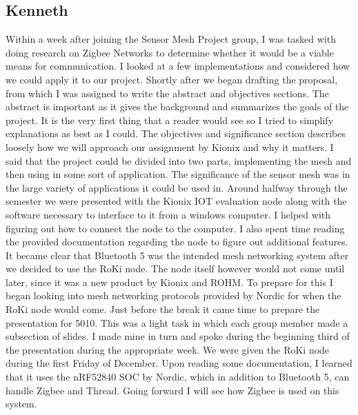 \documentclass[11pt, a4paper]{article}
\begin{document}
\subsection{Kenneth}

Within a week after joining the Sensor Mesh Project group, I was tasked with doing research on Zigbee Networks to determine whether it would be a viable means for communication.  I looked at a few implementations and considered how we could apply it to our project. Shortly after we began drafting the proposal, from which I was assigned to write the abstract and objectives sections. The abstract is important as it gives the background and summarizes the goals of the project. It is the very first thing that a reader would see so I tried to simplify explanations as best as I could. The objectives and significance section describes loosely how we will approach our assignment by Kionix and why it matters. I said that the project could be divided into two parts, implementing the mesh and then using in some sort of application. The significance of the sensor mesh was in the large variety of applications it could be used in. Around halfway through the semester we were presented with the Kionix IOT evaluation node along with the software necessary to interface to it from a windows computer. I helped with figuring out how to connect the node to the computer. I also spent time reading the provided documentation regarding the node to figure out additional features. It became clear that Bluetooth 5 was the intended mesh networking system after we decided to use the RoKi node. The node itself however would not come until later, since it was a new product by Kionix and ROHM. To prepare for this I began looking into mesh networking protocols provided by Nordic for when the RoKi node would come. Just before the break it came time to prepare the presentation for 5010. This was a light task in which each group member made a subsection of slides. I made mine in turn and spoke during the beginning third of the presentation during the appropriate week. We were given the RoKi node during the first Friday of December.  Upon reading some documentation, I learned that it uses the nRF52840 SOC by Nordic, which in addition to Bluetooth 5, can handle Zigbee and Thread. Going forward I will see how Zigbee is used on this system.
\end{document}
